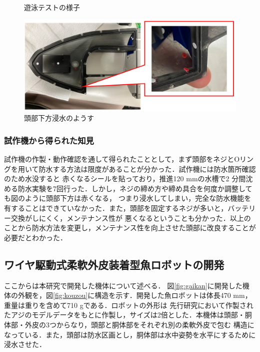\begin{figure}[t]
    \centering
    \caption{遊泳テストの様子}
    \label{fig:test_sisaku}
\end{figure}
\begin{figure}[t]
    \centering
    \includegraphics[width=0.80\linewidth]{chapters/picture/bousuitest.png}
    \caption{頭部下方浸水のようす}
    \label{fig:bousuitest_sisaku}
\end{figure}

\subsubsection{試作機から得られた知見}
試作機の作製・動作確認を通して得られたこととして，まず頭部をネジとOリングを用いて防水する方法は限度があることが分かった．試作機には防水箇所確認のため水没すると
赤くなるシールを貼っており，推進120 mmの水槽で2 分間沈める防水実験を7回行った．しかし，ネジの締め方や締め具合を何度か調整しても図のように頭部下方は赤くなる，
つまり浸水してしまい，完全な防水機能を有することはできていなかった．また，頭部を固定するネジが多いと，バッテリー交換がしにくく，メンテナンス性が
悪くなるということも分かった．以上のことから防水方法を変更し，メンテナンス性を向上させた頭部に改良することが必要だとわかった．

\newpage

\subsection{ワイヤ駆動式柔軟外皮装着型魚ロボットの開発}
ここからは本研究で開発した機体について述べる．
図\ref{fig:gaikan}に開発した機体の外観を，図\ref{fig:kouzou}に構造を示す．開発した魚ロボットは体長470 mm，重量は重りを含めて710 gである．ロボットの外形は
先行研究において作製されたアジのモデルデータをもとに作製し，サイズは2倍とした．本機体は頭部・胴体部・外皮の3つからなり，頭部と胴体部をそれぞれ別の柔軟外皮で包む
構造になっている．また，頭部は防水区画とし，胴体部は水中姿勢を水平にするために浸水させた．

